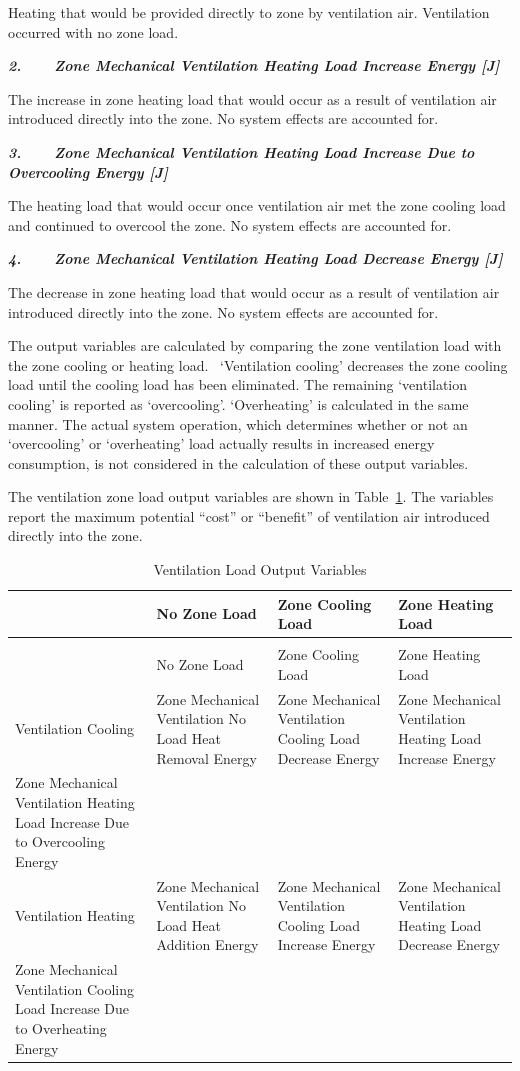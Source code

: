 Heating that would be provided directly to zone by ventilation air. Ventilation occurred with no zone load.

\textbf{\emph{2.~~~~Zone Mechanical Ventilation Heating Load Increase Energy {[}J{]}}}

The increase in zone heating load that would occur as a result of ventilation air introduced directly into the zone. No system effects are accounted for.

\textbf{\emph{3.~~~~Zone Mechanical Ventilation Heating Load Increase Due to Overcooling Energy {[}J{]}}}

The heating load that would occur once ventilation air met the zone cooling load and continued to overcool the zone. No system effects are accounted for.

\textbf{\emph{4.~~~~Zone Mechanical Ventilation Heating Load Decrease Energy {[}J{]}}}

The decrease in zone heating load that would occur as a result of ventilation air introduced directly into the zone. No system effects are accounted for.

The output variables are calculated by comparing the zone ventilation load with the zone cooling or heating load.~ `Ventilation cooling' decreases the zone cooling load until the cooling load has been eliminated. The remaining `ventilation cooling' is reported as `overcooling'. `Overheating' is calculated in the same manner. The actual system operation, which determines whether or not an `overcooling' or `overheating' load actually results in increased energy consumption, is not considered in the calculation of these output variables.

The ventilation zone load output variables are shown in Table~\ref{table:ventilation-load-output-variables}. The variables report the maximum potential ``cost'' or ``benefit'' of ventilation air introduced directly into the zone.

\begin{longtable}[c]{p{1.5in}p{1.5in}p{1.5in}p{1.5in}}
\caption{Ventilation Load Output Variables \label{table:ventilation-load-output-variables}} \tabularnewline
\toprule
 & No Zone Load & Zone Cooling Load & Zone Heating Load \tabularnewline
\midrule
\endfirsthead

\caption[]{Ventilation Load Output Variables} \tabularnewline
\toprule
 & No Zone Load & Zone Cooling Load & Zone Heating Load \tabularnewline
\midrule
\endhead

Ventilation Cooling & Zone Mechanical Ventilation No Load Heat Removal Energy & Zone Mechanical Ventilation Cooling Load Decrease Energy & Zone Mechanical Ventilation Heating Load Increase Energy \tabularnewline
Zone Mechanical Ventilation Heating Load Increase Due to Overcooling Energy \tabularnewline
Ventilation Heating & Zone Mechanical Ventilation No Load Heat Addition Energy & Zone Mechanical Ventilation Cooling Load Increase Energy & Zone Mechanical Ventilation Heating Load Decrease Energy \tabularnewline
Zone Mechanical Ventilation Cooling Load Increase Due to Overheating Energy \tabularnewline
\bottomrule
\end{longtable}

